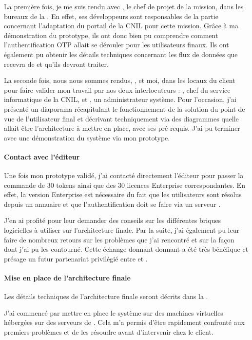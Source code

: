 La première fois, je me suis rendu avec \asegir{}, le chef de projet de la mission, dans les bureaux de la \abugan.
En effet, ses développeurs sont responsables de la partie concernant l'adaptation du portail \atypo{} de la CNIL pour cette mission.
Grâce à ma démonstration du prototype, ils ont donc bien pu comprendre comment l'authentification OTP allait se dérouler pour les utilisateurs finaux.
Ils ont également pu obtenir les détails techniques concernant les flux de données que \atypo{} recevra de \alinotp{} et qu'ils devront traiter.

La seconde fois, nous nous sommes rendus, \apakou, \asegir{} et moi, dans les locaux du client pour faire valider mon travail par nos deux interlocuteurs : \ahbt, chef du service informatique de la CNIL, et \amimiette, un administrateur système.
Pour l'occasion, j'ai présenté un diaporama récapitulant le fonctionnement de la solution du point de vue de l'utilisateur final et décrivant techniquement via des diagrammes quelle allait être l'architecture à mettre en place, avec ses pré-requis.
J'ai pu terminer avec une démonstration du système via mon prototype.

\paragraph{Contact avec l'éditeur}
Une fois mon prototype validé, j'ai contacté directement l'éditeur \alse{} pour passer la commande de 30 tokens ainsi que des 30 licences \alinotp{} Enterprise correspondantes.
En effet, la version Enterprise est nécessaire du fait que les utilisateurs sont résolus depuis un annuaire \aad{} et que l'authentification doit se faire via un serveur \aradius.

J'en ai profité pour leur demander des conseils sur les différentes briques logicielles à utiliser sur l'architecture finale.
Par la suite, j'ai également pu leur faire de nombreux retours sur les problèmes que j'ai rencontré et sur la façon dont j'ai pu les contourné.
Cette échange donnant-donnant a été très bénéfique et présage un futur partenariat privilégié entre \asmile{} et \alse{}.

\paragraph{Mise en place de l'architecture finale}
Les détails techniques de l'architecture finale seront décrits dans la .

J'ai commencé par mettre en place le système sur des machines virtuelles hébergées sur des serveurs de \asmile{}.
Cela m'a permis d'être rapidement confronté aux premiers problèmes et de les résoudre avant d'intervenir chez le client.

